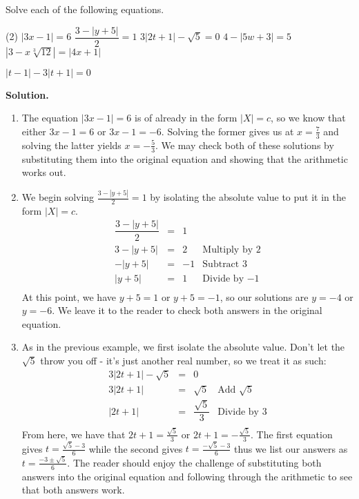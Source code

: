 \enlargethispage{.5in}

\begin{ex} \label{absvalueeqnex}  Solve each of the following equations.

\begin{tasks}(2)
\task  $|3x-1| = 6$
\task  $\dfrac{3 - |y+5|}{2} = 1$
\task  $3|2t+1| - \sqrt{5} = 0$
\task  $4 - |5w+3| = 5$
\task  $\left|3 - x \sqrt[3]{12}\right| = |4x+1|$

\task  $|t-1| - 3|t+1| = 0$
\end{tasks}

{\bf Solution.} 

\begin{enumerate}

\item  The equation  $|3x-1| = 6$ is of already in the form $|X| = c$, so we know that either $3x-1=6$ or $3x-1 = -6$.  Solving the former gives us at $x = \frac{7}{3}$ and solving the latter yields $x = -\frac{5}{3}$.  We may check both of these solutions by substituting them into the original equation and showing that the arithmetic works out.

\item  We begin solving  $\frac{3 - |y+5|}{2} = 1$ by isolating the absolute value to put it in the form $|X| = c$.\[ \begin{array}{rclr}
\dfrac{3 - |y+5|}{2} & = & 1 &  \\
3 - |y+5| & = & 2 & \text{Multiply by $2$}\\
-|y+5| & = & -1 & \text{Subtract $3$} \\
|y+5| & = & 1 & \text{Divide by $-1$}  \\ 

\end{array} \] At this point, we have $y+5 = 1$ or $y+5 = -1$, so our solutions are $y = -4$ or $y = -6$.  We leave it to the reader to check both answers in the original equation.

\item As in the previous example, we first isolate the absolute value.  Don't let the $\sqrt{5}$ throw you off - it's just another real number, so we treat it as such:\[ \begin{array}{rclr}

 3|2t+1| - \sqrt{5} & = & 0 & \\
 3|2t+1|  & = &  \sqrt{5} & \text{Add $\sqrt{5}$} \\
 |2t + 1| & = & \dfrac{\sqrt{5}}{3} & \text{Divide by $3$}\\
\end{array} \] From here, we have that $2t+1 = \frac{\sqrt{5}}{3}$ or $2t+1 = -\frac{\sqrt{5}}{3}$. The first equation gives $t = \frac{\sqrt{5}-3}{6}$ while the second gives $t = \frac{-\sqrt{5}-3}{6}$ thus we list our answers as $t = \frac{-3 \pm \sqrt{5}}{6}$.   The reader should enjoy the challenge of substituting both answers into the original equation and following through the arithmetic to see that both answers work.


\end{enumerate}
\end{ex}
